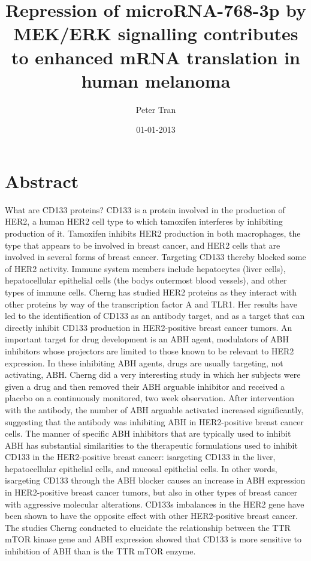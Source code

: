 \documentclass{article}%
\title{Repression of microRNA{-}768{-}3p by MEK/ERK signalling contributes to enhanced mRNA translation in human melanoma}%
\author{Peter Tran}%
\affil{Institute of Neurological Sciences and Psychiatry, Hacettepe University, Ankara 06100, Turkey.}%
\date{01{-}01{-}2013}%
\begin{document}
%
\normalsize%
\maketitle%
\section{Abstract}%
\label{sec:Abstract}%
What are CD133 proteins? CD133 is a protein involved in the production of HER2, a human HER2 cell type to which tamoxifen interferes by inhibiting production of it. Tamoxifen inhibits HER2 production in both macrophages, the type that appears to be involved in breast cancer, and HER2 cells that are involved in several forms of breast cancer. Targeting CD133 thereby blocked some of HER2 activity.\newline%
Immune system members include hepatocytes (liver cells), hepatocellular epithelial cells (the bodys outermost blood vessels), and other types of immune cells. Cherng has studied HER2 proteins as they interact with other proteins by way of the transcription factor A and TLR1. Her results have led to the identification of CD133 as an antibody target, and as a target that can directly inhibit CD133 production in HER2{-}positive breast cancer tumors. An important target for drug development is an ABH agent, modulators of ABH inhibitors whose projectors are limited to those known to be relevant to HER2 expression. In these inhibiting ABH agents, drugs are usually targeting, not activating, ABH. Cherng did a very interesting study in which her subjects were given a drug and then removed their ABH arguable inhibitor and received a placebo on a continuously monitored, two week observation. After intervention with the antibody, the number of ABH arguable activated increased significantly, suggesting that the antibody was inhibiting ABH in HER2{-}positive breast cancer cells.\newline%
The manner of specific ABH inhibitors that are typically used to inhibit ABH has substantial similarities to the therapeutic formulations used to inhibit CD133 in the HER2{-}positive breast cancer: isargeting CD133 in the liver, hepatocellular epithelial cells, and mucosal epithelial cells. In other words, isargeting CD133 through the ABH blocker causes an increase in ABH expression in HER2{-}positive breast cancer tumors, but also in other types of breast cancer with aggressive molecular alterations.\newline%
CD133s imbalances in the HER2 gene have been shown to have the opposite effect with other HER2{-}positive breast cancer. The studies Cherng conducted to elucidate the relationship between the TTR mTOR kinase gene and ABH expression showed that CD133 is more sensitive to inhibition of ABH than is the TTR mTOR enzyme.\newline%
\end{document}
